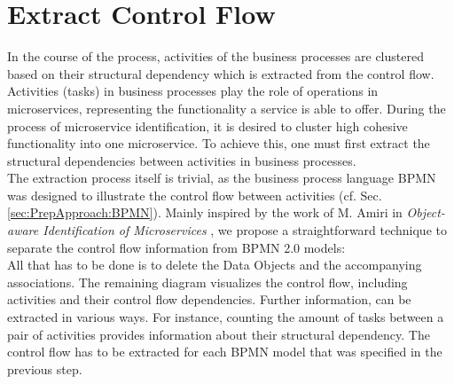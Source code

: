 \section{Extract Control Flow}
\label{sec:Solution:ExtractControlFlow}
In the course of the process, activities of the business processes are clustered based on their structural dependency which is extracted from the control flow. Activities (tasks) in business processes play the role of operations in microservices, representing the functionality a service is able to offer. During the process of microservice identification, it is desired to cluster high cohesive functionality into one microservice. To achieve this, one must first extract the structural  dependencies between activities in business processes. \\
The extraction process itself is trivial, as the business process language BPMN was designed to illustrate the control flow between activities (cf. Sec.\ref{sec:PrepApproach:BPMN}). Mainly inspired by the work of M. Amiri in \textit{Object-aware Identification of Microservices} \cite{ObjectAwareAmiri}, we propose a straightforward technique to separate the control flow information from BPMN 2.0 models:\\
All that has to be done is to delete the Data Objects and the accompanying associations. The remaining diagram visualizes the control flow, including activities and their control flow dependencies. Further information, can be extracted in various ways. For instance, counting the amount of tasks between a pair of activities provides information about their structural dependency.  The control flow has to be extracted for each BPMN model that was specified in the previous step.




